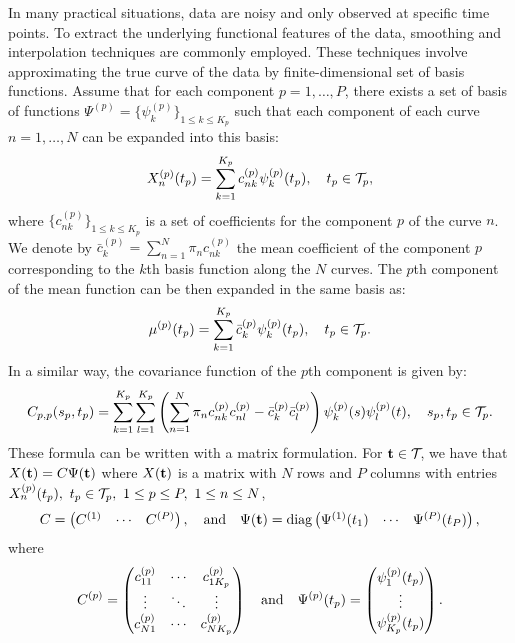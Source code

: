 In many practical situations, data are noisy and only observed at specific time points. To extract the underlying functional features of the data, smoothing and interpolation techniques are commonly employed. These techniques involve approximating the true curve of the data by finite-dimensional set of basis functions. Assume that for each component $p = 1, \dots, P$, there exists a set of basis of functions $\Psi^{(p)} = \{\psi_k^{(p)}\}_{1 \leq k \leq K_p}$ such that each component of each curve $n = 1, \dots, N$ can be expanded into this basis:
\begin{equation}
X_n^{(p)}(t_p) = \sum_{k = 1}^{K_p} c^{(p)}_{nk}\psi_k^{(p)}(t_p), \quad t_p \in \mathcal{T}_{p},
\end{equation}
where $\{c^{(p)}_{nk}\}_{1 \leq k \leq K_p}$ is a set of coefficients for the component $p$ of the curve $n$. We denote by $\bar{c}_k^{(p)} = \sum_{n = 1}^N \pi_n c^{(p)}_{nk}$ the mean coefficient of the component $p$ corresponding to the $k$th basis function along the $N$ curves.
The $p$th component of the mean function can be then expanded in the same basis as:
\begin{equation}
    \mu^{(p)}(t_p) = \sum_{k = 1}^{K_p} \bar{c}_k^{(p)}\psi_k^{(p)}(t_p), \quad t_p \in \mathcal{T}_{p}.
\end{equation}
In a similar way, the covariance function of the $p$th component is given by:
\begin{equation}
    C_{p,p}(s_p, t_p) = \sum_{k = 1}^{K_p} \sum_{l = 1}^{K_p} \left(\sum_{n = 1}^N \pi_n c^{(p)}_{nk}c^{(p)}_{nl} - \bar{c}_k^{(p)}\bar{c}_l^{(p)}\right)\psi_k^{(p)}(s)\psi_l^{(p)}(t), \quad s_p, t_p \in \mathcal{T}_{p}.
\end{equation}
These formula can be written with a matrix formulation. For $\mathbf{t} \in \mathcal{T}_{}$, we have that $X(\mathbf{t}) = C\Psi(\mathbf{t})$ where $X(\mathbf{t})$ is a matrix with $N$ rows and $P$ columns with entries $X_n^{(p)}(t_p),~t_p \in \mathcal{T}_{p},~1 \leq p \leq P,~1 \leq n \leq N$,
\begin{equation}
    C = \begin{pmatrix}
            C^{(1)} & \cdots & C^{(P)} \\
        \end{pmatrix}, \quad \text{and}\quad
    \Psi(\mathbf{t}) = \text{diag}\begin{pmatrix}
        \Psi^{(1)}(t_1) & \cdots & \Psi^{(P)}(t_P)
    \end{pmatrix},
\end{equation}
where
\begin{equation}
C^{(p)} = \begin{pmatrix}
    c^{(p)}_{11} & \cdots & c^{(p)}_{1K_p} \\
    \vdots & \ddots & \vdots \\
    c^{(p)}_{N1} & \cdots & c^{(p)}_{NK_p}
\end{pmatrix} \\
\quad \text{and}\quad
\Psi^{(p)}(t_p) = \begin{pmatrix}
    \psi_1^{(p)}(t_p) \\
    \vdots \\
    \psi_{K_p}^{(p)}(t_p)
\end{pmatrix}.
\end{equation}

